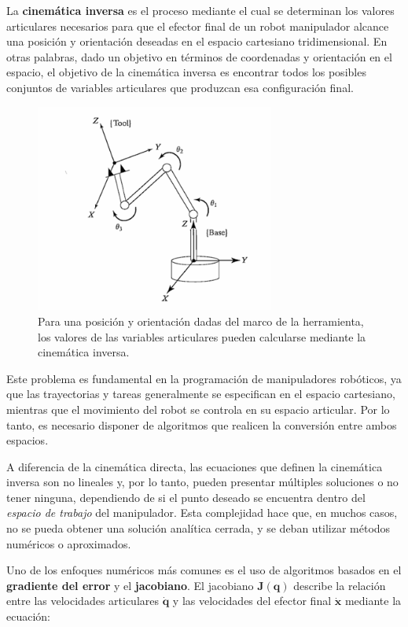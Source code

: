 La \textbf{cinemática inversa} es el proceso mediante el cual se determinan los valores articulares necesarios para que el efector final de un robot manipulador alcance una posición y orientación deseadas en el espacio cartesiano tridimensional. En otras palabras, dado un objetivo en términos de coordenadas y orientación en el espacio, el objetivo de la cinemática inversa es encontrar todos los posibles conjuntos de variables articulares que produzcan esa configuración final.

	\begin{figure}[H]
	\centering
	\includegraphics[width=0.7\textwidth]{img/cinematicainv.png}
	\caption{Para una posición y orientación dadas del marco de la herramienta, los valores de las variables articulares pueden calcularse mediante la cinemática inversa.}
	\label{fig:CinematicaInversa}
\end{figure}

Este problema es fundamental en la programación de manipuladores robóticos, ya que las trayectorias y tareas generalmente se especifican en el espacio cartesiano, mientras que el movimiento del robot se controla en su espacio articular. Por lo tanto, es necesario disponer de algoritmos que realicen la conversión entre ambos espacios.

A diferencia de la cinemática directa, las ecuaciones que definen la cinemática inversa son no lineales y, por lo tanto, pueden presentar múltiples soluciones o no tener ninguna, dependiendo de si el punto deseado se encuentra dentro del \textit{espacio de trabajo} del manipulador. Esta complejidad hace que, en muchos casos, no se pueda obtener una solución analítica cerrada, y se deban utilizar métodos numéricos o aproximados.

Uno de los enfoques numéricos más comunes es el uso de algoritmos basados en el \textbf{gradiente del error} y el \textbf{jacobiano}. El jacobiano $\mathbf{J}(\mathbf{q})$ describe la relación entre las velocidades articulares $\dot{\mathbf{q}}$ y las velocidades del efector final $\dot{\mathbf{x}}$ mediante la ecuación:

